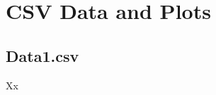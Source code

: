 \documentclass{article}
\begin{document}
\section*{CSV Data and Plots}

\subsection*{Data1.csv}Xx

 
\end{document}

